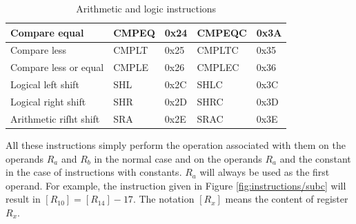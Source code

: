 \begin{table}[H]
\begin{tabular}{|l|l|l|l|l|}
    Compare equal                                               & CMPEQ                                                           & 0x24                                                         & CMPEQC                                                                & 0x3A                                                               \\ \hline
    Compare less                                                & CMPLT                                                           & 0x25                                                         & CMPLTC                                                                & 0x35                                                               \\ \hline
    Compare less or equal                                       & CMPLE                                                           & 0x26                                                         & CMPLEC                                                                & 0x36                                                               \\ \hline
    Logical left shift                                          & SHL                                                             & 0x2C                                                         & SHLC                                                                  & 0x3C                                                               \\ \hline
    Logical right shift                                         & SHR                                                             & 0x2D                                                         & SHRC                                                                  & 0x3D                                                               \\ \hline
    Arithmetic rifht shift                                      & SRA                                                             & 0x2E                                                         & SRAC                                                                  & 0x3E                                                               \\ \hline
    \end{tabular}
    \caption{Arithmetic and logic instructions}
    \label{tab:instruction/alu}
\end{table}

All these instructions simply perform the operation associated with them on the operands $R_a$ and 
$R_b$ in the normal case and on the operands $R_a$ and the constant in the case of instructions 
with constants. $R_a$ will always be used as the first operand. For example, the instruction given 
in Figure \ref{fig:instructions/subc} will result in $[R_{10}] = [R_{14}] - 17$. The notation 
$[R_x]$ means the content of register $R_x$.

